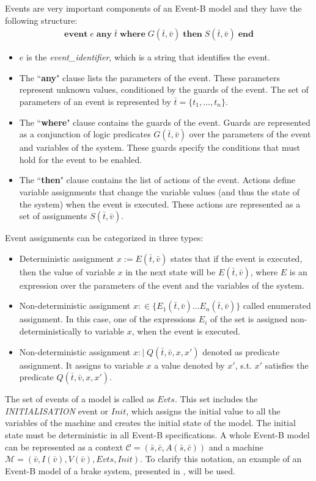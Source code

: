 Events are very important components of an Event-B model and they have the following structure:
\begin{align*}
    \textbf{event} \; e \; \textbf{any} \; \bar{t} \; \textbf{where} \; G(\bar{t}, \bar{v}) \; \textbf{then} \; S(\bar{t}, \bar{v}) \; \textbf{end} 
\end{align*}
\begin{itemize}
    \item $e$ is the \textit{event\_identifier}, which is a string that identifies the event.
    \item The ``\textbf{any}" clause lists the parameters of the event. These parameters represent unknown values, conditioned by the guards of the event. The set of parameters of an event is represented by $\bar{t} = \{t_1,...,t_n\}$.
    \item The ``\textbf{where}" clause contains the guards of the event. Guards are represented as a conjunction of logic predicates $G(\bar{t}, \bar{v})$ over the parameters of the event and variables of the system. These guards specify the conditions that must hold for the event to be enabled.
    \item The ``\textbf{then}" clause contains the list of actions of the event. Actions define variable assignments that change the variable values (and thus the state of the system) when the event is executed. These actions are represented as a set of assignments $S(\bar{t}, \bar{v})$.
\end{itemize} 
Event assignments can be categorized in three types:
\begin{itemize}
    \item Deterministic assignment $x := E(\bar{t},\bar{v})$ states that if the event is executed, then the value of variable $x$ in the next state will be $E(\bar{t},\bar{v})$, where $E$ is an expression over the parameters of the event and the variables of the system.
    \item Non-deterministic assignment $x :\in  \{ E_1(\bar{t},\bar{v})... E_n(\bar{t},\bar{v}) \}$ called enumerated assignment. In this case, one of the expressions $E_i$ of the set is assigned non-deterministically to variable $x$, when the event is executed.
    \item Non-deterministic assignment $x :\! | \; Q(\bar{t}, \bar{v}, x, x')$ denoted as predicate assignment. It assigns to variable $x$ a value denoted by $x'$, s.t. $x'$ satisfies the predicate $Q(\bar{t}, \bar{v}, x, x')$.
\end{itemize}
The set of events of a model is called as $Evts$. This set includes the \textit{INITIALISATION} event or $Init$, which assigns the initial value to all the variables of the machine and creates the initial state of the model. The initial state must be deterministic in all Event-B specifications. A whole Event-B model can be represented as a context $\mathscr{C} = (\bar{s},\bar{c}, A(\bar{s},\bar{c}))$ and a machine $\mathscr{M} =(\bar{v}, I(\bar{v}), V(\bar{v}), Evts, Init)$.
To clarify this notation, an example of an Event-B model of a brake system, presented in \cite{Aouadhi2017}, will be used. 

